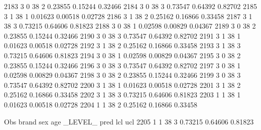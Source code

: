 \documentclass{article}
\begin{document}
\begin{Woutput}
2183      3       0      38       2       0.23855    0.15244    0.32466
2184      3       0      38       3       0.73547    0.64392    0.82702
2185      3       1      38       1       0.01623    0.00518    0.02728
2186      3       1      38       2       0.25162    0.16866    0.33458
2187      3       1      38       3       0.73215    0.64606    0.81823
2188      3       0      38       1       0.02598    0.00829    0.04367
2189      3       0      38       2       0.23855    0.15244    0.32466
2190      3       0      38       3       0.73547    0.64392    0.82702
2191      3       1      38       1       0.01623    0.00518    0.02728
2192      3       1      38       2       0.25162    0.16866    0.33458
2193      3       1      38       3       0.73215    0.64606    0.81823
2194      3       0      38       1       0.02598    0.00829    0.04367
2195      3       0      38       2       0.23855    0.15244    0.32466
2196      3       0      38       3       0.73547    0.64392    0.82702
2197      3       0      38       1       0.02598    0.00829    0.04367
2198      3       0      38       2       0.23855    0.15244    0.32466
2199      3       0      38       3       0.73547    0.64392    0.82702
2200      3       1      38       1       0.01623    0.00518    0.02728
2201      3       1      38       2       0.25162    0.16866    0.33458
2202      3       1      38       3       0.73215    0.64606    0.81823
2203      1       1      38       1       0.01623    0.00518    0.02728
2204      1       1      38       2       0.25162    0.16866    0.33458

 Obs    brand    sex    age    _LEVEL_      pred       lcl        ucl
2205      1       1      38       3       0.73215    0.64606    0.81823
\end{Woutput}
\end{document}
